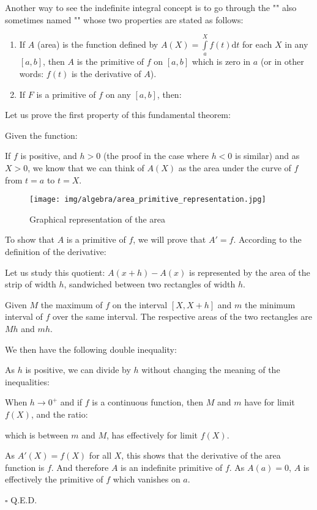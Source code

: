 	
	Another way to see the indefinite integral concept is to go through the "" also sometimes named "" whose two properties are stated as follows:
	\begin{enumerate}
		\item If $A$ (area) is the function defined by $A(X)=\displaystyle\int\limits_a^X f(t)\mathrm{d}t$ for each $X$ in any $[a, b]$, then $A$ is the primitive of $f$ on $[a, b]$ which is zero in $a$ (or in other words: $f (t)$ is the derivative of $A$).
		\item If $F$ is a primitive of $f$ on any $[a, b]$, then:
		
	\end{enumerate}
	Let us prove the first property of this fundamental theorem:
	\begin{dem}
	Given the function:
	
	If $f$ is positive, and $h>0$ (the proof in the case where $h<0$ is similar) and as $X>0$, we know that we can think of $A(X)$ as the area under the curve of $f$ from $t=a$ to $t=X$.
	\begin{figure}[H]
		\centering
		\texttt{[image: img/algebra/area\_primitive\_representation.jpg]}
		\caption{Graphical representation of the area}
	\end{figure}
	To show that $A$ is a primitive of $f$, we will prove that $A'=f$. According to the definition of the derivative:
	
	Let us study this quotient: $A(x+h)-A(x)$ is represented by the area of the strip of width $h$, sandwiched between two rectangles of width $h$.
	
		Given $M$ the maximum of $f$ on the interval $[X,X+h]$ and $m$ the minimum interval of $f$ over the same interval. The respective areas of the two rectangles are $Mh$ and $mh$.
	
	We then have the following double inequality:
	

	As $h$ is positive, we can divide by $h$ without changing the meaning of  the inequalities:
	
	When $h\rightarrow 0^+$ and if $f$ is a continuous function, then $M$ and $m$ have for limit $f (X)$, and the ratio:
	
	which is between $m$ and $M$, has effectively for limit $f(X)$.
	
	As $A'(X)=f(X)$ for all $X$, this shows that the derivative of the area function is $f$. And therefore $A$ is an indefinite primitive of $f$. As $A(a)=0$, $A$ is effectively the primitive of $f$ which vanishes on $a$.
	\begin{flushright}
		$\square$  Q.E.D.
	\end{flushright}
	\end{dem}
